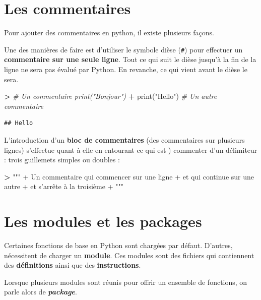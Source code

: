 \documentclass[12pt,]{book}
\newenvironment{Shaded}{\begin{snugshade}}{\end{snugshade}}
\newcommand{\StringTok}[1]{\textcolor[rgb]{0.31,0.60,0.02}{#1}}
\newcommand{\CommentTok}[1]{\textcolor[rgb]{0.56,0.35,0.01}{\textit{#1}}}
\newcommand{\OperatorTok}[1]{\textcolor[rgb]{0.81,0.36,0.00}{\textbf{#1}}}
\newcommand{\BuiltInTok}[1]{#1}
\newcommand{\NormalTok}[1]{#1}
\numberwithin{equation}{section}
\numberwithin{countremarque}{section}
\begin{document}
\section{Les commentaires}\label{les-commentaires}

Pour ajouter des commentaires en python, il existe plusieurs façons.

Une des manières de faire est d'utiliser le symbole dièse (\texttt{\#})
pour effectuer un \textbf{commentaire sur une seule ligne}. Tout ce qui
suit le dièse jusqu'à la fin de la ligne ne sera pas évalué par Python.
En revanche, ce qui vient avant le dièse le sera.

\begin{Shaded}
\begin{Highlighting}[]
\OperatorTok{>} \CommentTok{# Un commentaire print("Bonjour")}
\OperatorTok{+} \BuiltInTok{print}\NormalTok{(}\StringTok{"Hello"}\NormalTok{) }\CommentTok{# Un autre commentaire}
\end{Highlighting}
\end{Shaded}

\begin{lstlisting}
## Hello
\end{lstlisting}

L'introduction d'un \textbf{bloc de commentaires} (des commentaires sur
plusieurs lignes) s'effectue quant à elle en entourant ce qui est )
commenter d'un délimiteur : trois guillemets simples ou doubles :

\begin{Shaded}
\begin{Highlighting}[]
\OperatorTok{>} \StringTok{"""}
\StringTok{+ Un commentaire qui commencer sur une ligne}
\StringTok{+ et qui continue sur une autre}
\StringTok{+ et s'arrête à la troisième}
\StringTok{+ """}
\end{Highlighting}
\end{Shaded}

\section{Les modules et les packages}\label{les-modules-et-les-packages}

Certaines fonctions de base en Python sont chargées par défaut.
D'autres, nécessitent de charger un \textbf{module}. Ces modules sont
des fichiers qui contiennent des \textbf{définitions} ainsi que des
\textbf{instructions}.

Lorsque plusieurs modules sont réunis pour offrir un ensemble de
fonctions, on parle alors de \emph{\textbf{package}}.
\end{document}
